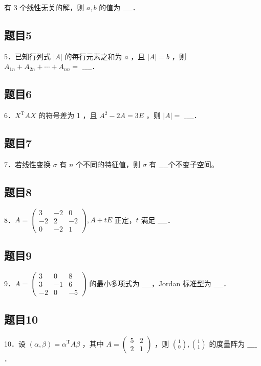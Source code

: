 \documentclass{article}
\begin{document}
有 3 个线性无关的解，则 \(a, b\) 的值为 \(\_\_\_\_\)．

\subsection{题目5}
5．已知行列式 \(|A|\) 的每行元素之和为 \(a\) ，且 \(|A|=b\) ，则 \(A_{1 n}+A_{2 n}+\cdots+A_{n n}=\) \(\_\_\_\_\)．

\subsection{题目6}
6．\(X^{\mathrm{T}} A X\) 的符号差为 1 ，且 \(A^{2}-2 A=3 E\) ，则 \(|A|=\) \(\_\_\_\_\)．

\subsection{题目7}
7．若线性变换 \(\sigma\) 有 \(n\) 个不同的特征值，则 \(\sigma\) 有 \(\_\_\_\_\)个不变子空间。

\subsection{题目8}
8．\(A=\left(\begin{array}{ccc}3 & -2 & 0 \\ -2 & 2 & -2 \\ 0 & -2 & 1\end{array}\right), A+t E\) 正定，\(t\) 满足 \(\_\_\_\_\)．

\subsection{题目9}
9．\(A=\left(\begin{array}{ccc}3 & 0 & 8 \\ 3 & -1 & 6 \\ -2 & 0 & -5\end{array}\right)\) 的最小多项式为 \(\_\_\_\_\)，Jordan 标准型为 \(\_\_\_\_\)．

\subsection{题目10}
10．设 \((\alpha, \beta)=\alpha^{\mathrm{T}} A \beta\) ，其中 \(A=\left(\begin{array}{ll}5 & 2 \\ 2 & 1\end{array}\right)\) ，则 \(\binom{1}{0},\binom{1}{1}\) 的度量阵为 \(\_\_\_\_\)．
\end{document}
